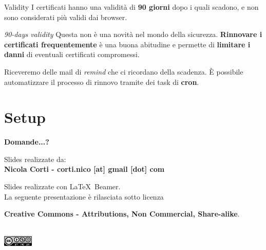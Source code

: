 \documentclass[xcolor=svgnames,11pt]{beamer}
\begin{document}
\begin{frame}{Validity}
I certificati hanno una validità di \textbf{90 giorni} dopo i quali scadono, e non sono
considerati più validi dai browser.

\medskip\pause

\begin{block}{\emph{90-days validity}}
Questa non è una novità nel mondo della sicurezza. \textbf{Rinnovare i certificati frequentemente}
è una buona abitudine e permette di \textbf{limitare i danni} di eventuali certificati compromessi.
\end{block}

\medskip\pause
Riceveremo delle mail di \emph{remind} che ci ricordano della scadenza.
È possibile automatizzare il processo di rinnovo tramite dei task di \textbf{cron}.
\end{frame}


\section{Setup}

\begin{frame}{}
\begin{center}
\begin{Huge}
{\color{leorange} \textbf{Domande...?}}
\end{Huge}

\vspace{1.5cm}
\begin{small}
Slides realizzate da:\\
\textbf{Nicola Corti - corti.nico [at] gmail [dot] com}\\

\bigskip

Slides realizzate con \LaTeX\ Beamer.\\
La seguente presentazione \`e rilasciata sotto licenza\\
\begin{footnotesize}	\textbf{Creative Commons - Attributions, Non Commercial, Share-alike}.
\end{footnotesize}
\\
\medskip
\includegraphics[height=0.5cm]{img/cc.png}

\end{small}
\end{center}
\end{frame}
\end{document}
